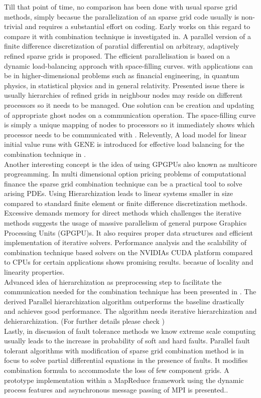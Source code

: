 Till that point of time, no comparison has been done with usual sparse grid methods, simply becasue the parallelization of an sparse grid code usually is non-trivial and requires a substantial effort on coding. Early works on this regard to compare it with combination technique is investigated in\cite{Zumbusch2000}.
A parallel version of a finite difference discretization of paratial differential on arbitrary, adaptively refined sparse grids is proposed. The efficient parallelisation is based on a dynamic load-balancing approach with space-filling curves. with applications can be in higher-dimensional problems such as financial engineering, in quantum physics, in statistical physics and in general relativity. Presented issue there is usually hierarchies of refined grids in neighbour nodes may reside on different processors so it needs to be managed. One solution can be creation and updating of appropriate ghost nodes on a communication operation. The space-filling curve is simply a unique mapping of nodes to processors so it immediately shows which processor needs to be communicated with \cite{Zumbusch2000}. Relevently, A load model for linear initial value runs with GENE is introduced for effective load balancing for the combination technique in \cite{Heene2014}. \\
Another interesting concept is the idea of using GPGPUs also known as multicore progreamming. In multi dimensional option pricing problems of computational finance the sparse grid combination technique can be a practical tool to solve arising PDEs. Using Hierarchization leads to linear systems smaller in size compared to standard finite element or finite difference discretization methods. Excessive demands memory for direct methods which challenges the iterative methods suggests the usage of massive parallelism of general purpose Graphics Processing Units (GPGPU)s. It also requires proper data structures and efficient implementation of iterative solvers. Performance analysis and the scalability of combination technique based solvers on the NVIDIAs CUDA platform compared to CPUs for certain applications shows promising results. becasue of locality and linearity properties.\cite{Gaikwad2009}\\
Advanced idea of hierarchization as preprocessing step to facilitate the communication needed for the combination technique has been presented in \cite{Hupp2013}. The derived Parallel hierarchization algorithm outperforms the baseline drastically and achieves good performance. The algorithm needs iterative hierarchization and dehierarchization. (For further details please check \cite{Hupp2013}) \\
Lastly, in discussion of fault tolerance methods we know extreme scale computing usually leads to the increase in probability of soft and hard faults. Parallel fault tolerant algorithms with modification of sparse grid combination method is in focus to solve partial differential equations in the presence of faults. It modifies combination formula to accommodate the loss of few component grids. A prototype implementation within a MapReduce framework using the dynamic process features and asynchronous message passing of MPI is presented.\cite{Larson2013}. 
